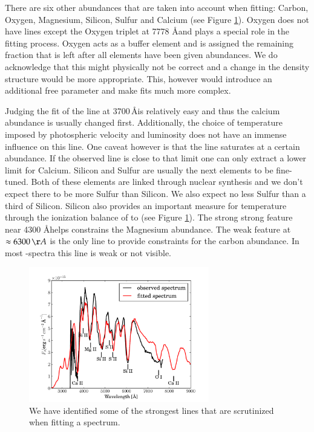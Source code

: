 There are six other abundances that are taken into account when fitting: Carbon, Oxygen, Magnesium, Silicon, Sulfur and Calcium (see Figure \ref{fig:sn2002bo_lineident}). Oxygen does not have lines except the Oxygen triplet at 7778 \AA and plays a special role in the fitting process. Oxygen acts as a buffer element and is assigned the remaining fraction that is left after all elements have been given abundances. We do acknowledge that this might physically not be correct and a change in the density structure would be more appropriate. This, however would introduce an additional free parameter and make fits much more complex.

Judging the fit of the  line at 3700\,\AA is relatively easy and thus the calcium abundance is usually changed first. Additionally, the choice of temperature imposed by photospheric velocity and luminosity does not have an immense influence on this line. One caveat however is that the  line saturates at a certain abundance. If the observed  line is close to that limit one can only extract a lower limit for Calcium.
Silicon and Sulfur are usually the next elements to be fine-tuned. Both of these elements are linked through nuclear synthesis and we don't expect there to be more Sulfur than Silicon. We also expect no less Sulfur than a third of Silicon. Silicon also provides an important measure for temperature through the ionization balance of  to  (see Figure \ref{fig:sn2002bo_lineident}). The strong strong  feature near 4300 \AA helps constrains the Magnesium abundance. The weak  feature at $\approx 6300\,\AA$ is the only line to provide constraints for the carbon abundance. In most \sneia-spectra this line is weak or not visible.
\begin{figure}[htbp] %
   \centering
   \includegraphics[width=0.7\textwidth]{chapter_dalek/plots/bf2002bo-10_lineid.pdf} 
   \caption{We have identified some of the strongest lines that are scrutinized when fitting a  spectrum.}
   \label{fig:sn2002bo_lineident}
\end{figure}

